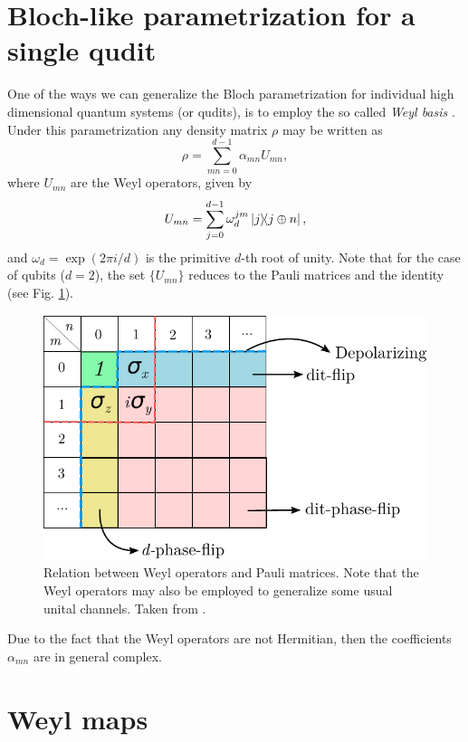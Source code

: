 \section{Bloch-like parametrization for a single qudit}
% 
One of the ways we can generalize the Bloch parametrization for individual high dimensional quantum systems (or qudits), is to employ the so called \textit{Weyl basis} \cite{Bertlmann2008}. Under this parametrization any density matrix $\rho$ may be written as
% 
\begin{equation}
\rho=\sum_{mn=0}^{d-1} \alpha_{mn} U_{mn},
\label{rho}
\end{equation}
% 
where $U_{mn}$ are the Weyl operators, given by
% 
\begin{equation}
U_{mn}=\sum_{j=0}^{d-1}\omega_d^{j m}\dyad{j}{j\oplus n},
\label{Umn}
\end{equation}
% 
and $\omega_d=\exp(2\pi i/d)$ is the primitive $d$-th root of unity. Note that for the case of qubits ($d=2$), the set $\{U_{mn}\}$ reduces to the Pauli matrices and the identity (see Fig. \ref{Weyl_Pauli}).

\begin{figure}[h]
  \centering
  \includegraphics[scale=0.65]{Weyl_2.pdf}
  \caption{Relation between Weyl operators and Pauli matrices. Note that the Weyl operators may also be employed to generalize some usual unital channels. Taken from \cite{Fonseca2019}.}
  \label{Weyl_Pauli}
\end{figure}
% 
Due to the fact that the Weyl operators are not Hermitian, then the coefficients $\alpha_{mn}$ are in general complex.

\section{Weyl maps}

